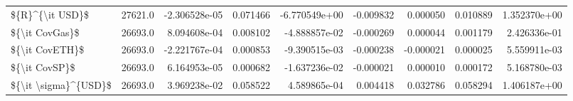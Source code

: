 \begin{tabular}{lrrrrrrrr}
\$\{R\}\textasciicircum \{\textbackslash it USD\}\$          &  27621.0 &  -2.306528e-05 &  0.071466 & -6.770549e+00 & -0.009832 &  0.000050 &  0.010889 &   1.352370e+00 \\
\$\{\textbackslash it CovGas\}\$           &  26693.0 &   8.094608e-04 &  0.008102 & -4.888857e-02 & -0.000269 &  0.000044 &  0.001179 &   2.426336e-01 \\
\$\{\textbackslash it CovETH\}\$           &  26693.0 &  -2.221767e-04 &  0.000853 & -9.390515e-03 & -0.000238 & -0.000021 &  0.000025 &   5.559911e-03 \\
\$\{\textbackslash it CovSP\}\$            &  26693.0 &   6.164953e-05 &  0.000682 & -1.637236e-02 & -0.000021 &  0.000010 &  0.000172 &   5.168780e-03 \\
\$\{\textbackslash it \textbackslash sigma\}\textasciicircum \{USD\}\$     &  26693.0 &   3.969238e-02 &  0.058522 &  4.589865e-04 &  0.004418 &  0.032786 &  0.058294 &   1.406187e+00 \\
\bottomrule
\end{tabular}
